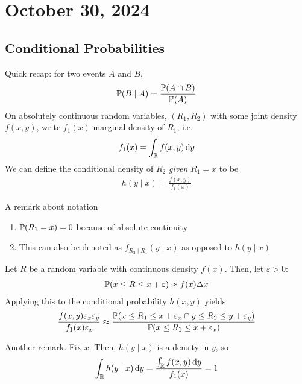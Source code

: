 \section{October 30, 2024}

\subsection{Conditional Probabilities}
Quick recap: for two events $A$ and $B$,
\begin{align}
    \mathbb{P}(B \mid A) = \frac{\mathbb{P}(A \cap B)}{\mathbb{P}(A)}
\end{align}
On absolutely continuous random variables, $(R_1,R_2)$ with some joint density $f(x, y)$, write $f_1(x)$ marginal density of $R_1$, i.e.
\begin{align}
    f_1(x) = \int_{\mathbb{R}} f(x,y) \dd{y}
\end{align}
We can define the conditional density of $R_2$ \textit{given} $R_1 = x$ to be
\begin{align}
    h(y \mid x) = \frac{f(x,y)}{f_1(x)}
\end{align}

\begin{aside}
    A remark about notation
    \begin{enumerate}
        \item $\mathbb{P}(R_1 = x) = 0$ because of absolute continuity
        \item This can also be denoted as $f_{R_2 \mid R_1}(y \mid x)$ as opposed to $h(y \mid x)$
    \end{enumerate}
\end{aside}

Let $R$ be a random variable with continuous density $f(x)$. Then, let $\varepsilon > 0$:
\begin{align}
    \mathbb{P}(x \le R \le x + \varepsilon) \approx f(x) \Delta x
\end{align}
Applying this to the conditional probability $h(x,y)$ yields
\begin{align}
    \frac{f(x,y) \varepsilon_x \varepsilon_y}{f_1(x) \varepsilon_x} \approx \dfrac{\mathbb{P}(x \le R_1 \le x + \varepsilon_x \cap y \le R_2 \le y + \varepsilon_y)}{\mathbb{P}(x \le R_1 \le x + \varepsilon_x)}
\end{align}

\begin{aside}
    Another remark. Fix $x$. Then, $h(y \mid x)$ is a density in $y$, so
    \begin{align}
        \int_{\mathbb{R}} h(y \mid x) \dd{y} = \frac{\int_{\mathbb{R}} f(x,y)\dd{y}}{f_1(x)} = 1
    \end{align}
\end{aside}

